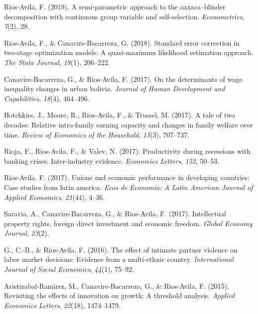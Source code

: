 \documentclass[
  letterpaper,
]{moderncv}
\newlength{\cslhangindent}
\newenvironment{CSLReferences}[2] %
 {\begin{list}{}{%
  \setlength{\itemindent}{0pt}
  \setlength{\leftmargin}{0pt}
  \setlength{\parsep}{0pt}
  \ifodd #1
   \setlength{\leftmargin}{\cslhangindent}
   \setlength{\itemindent}{-1\cslhangindent}
  \fi
  \setlength{\itemsep}{#2\baselineskip}}}
 {\end{list}}
\begin{document}
\begin{CSLReferences}{1}{0}
Rios-Avila, F. (2019). A semi-parametric approach to the oaxaca--blinder
decomposition with continuous group variable and self-selection.
\emph{Econometrics}, \emph{7}(2), 28.

Rios-Avila, F., \& Canavire-Bacarreza, G. (2018). Standard error
correction in two-stage optimization models: A quasi-maximum likelihood
estimation approach. \emph{The Stata Journal}, \emph{18}(1), 206--222.

Canavire-Bacarreza, G., \& Rios-Avila, F. (2017). On the determinants of
wage inequality changes in urban bolivia. \emph{Journal of Human
Development and Capabilities}, \emph{18}(4), 464--496.

Hotchkiss, J., Moore, R., Rios-Avila, F., \& Trussel, M. (2017). A tale
of two decades: Relative intra-family earning capacity and changes in
family welfare over time. \emph{Review of Economics of the Household},
\emph{15}(3), 707--737.

Rioja, F., Rios-Avila, F., \& Valev, N. (2017). Productivity during
recessions with banking crises: Inter-industry evidence. \emph{Economics
Letters}, \emph{152}, 50--53.

Rios-Avila, F. (2017). Unions and economic performance in developing
countries: Case studies from latin america. \emph{Ecos de Economia: A
Latin American Journal of Applied Economics}, \emph{21}(44), 4--36.

Saravia, A., Canavire-Bacarreza, G., \& Rios-Avila, F. (2017).
Intellectual property rights, foreign direct investment and economic
freedom. \emph{Global Economy Journal}, \emph{23}(2).

G., C.-B., \& Rios-Avila, F. (2016). The effect of intimate partner
violence on labor market decisions: Evidence from a multi-ethnic
country. \emph{International Journal of Social Economics}, \emph{44}(1),
75--92.

Aristizabal-Ramirez, M., Canavire-Bacarreza, G., \& Rios-Avila, F.
(2015). Revisiting the effects of innovation on growth: A threshold
analysis. \emph{Applied Economics Letters}, \emph{22}(18), 1474--1479.


\end{CSLReferences}
\end{document}
